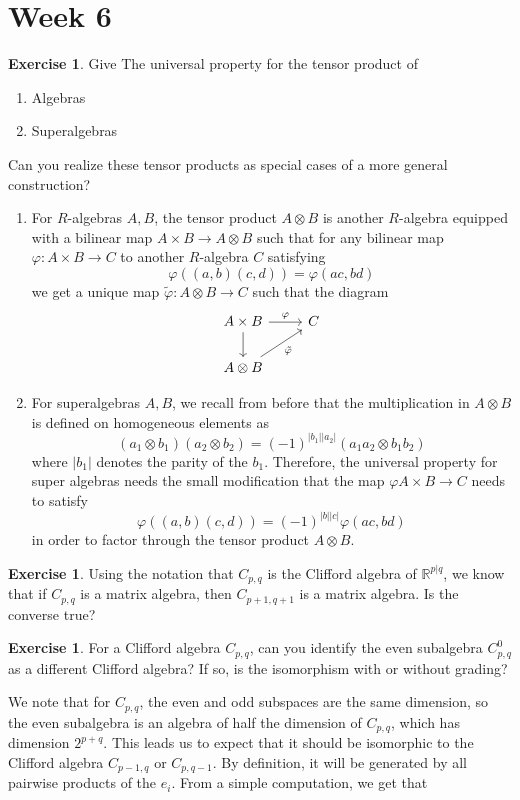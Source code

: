 \documentclass[psamsfonts]{amsart}
\theoremstyle{definition}
\newtheorem{exer}[thm]{Exercise}
\theoremstyle{remark}
\newcommand{\R}{\mathbb{R}}
\begin{document}
\section*{Week 6}
%
\begin{exer}
Give The universal property for the tensor product of
\begin{enumerate}
\item Algebras
\item Superalgebras
\end{enumerate}
Can you realize these tensor products as special cases of a more general construction?
\end{exer}
\begin{enumerate}
\item For $R$-algebras $A,B$, the tensor product $A \otimes B$ is another $R$-algebra equipped with a bilinear map $A \times B \to A \otimes B$ such that for any bilinear map $\varphi : A \times B \to C$ to another $R$-algebra $C$ satisfying 
$$\varphi((a,b)(c,d)) = \varphi(ac, bd)$$
we get a unique map $\tilde{\varphi} : A \otimes B \to C$ such that the diagram
$$\begin{tikzcd}
A \times B \ar[d] \ar[r, "\varphi"] & C \\
A \otimes B \ar[ur, "\tilde{\varphi}"']
\end{tikzcd}$$
\item For superalgebras $A,B$, we recall from before that the multiplication in $A \otimes B$ is defined on homogeneous elements as
$$(a_1 \otimes b_1)(a_2 \otimes b_2) = (-1)^{|b_1||a_2|} (a_1a_2 \otimes b_1b_2)$$
where $|b_1|$ denotes the parity of the $b_1$. Therefore, the universal property for super algebras needs the small modification that the map $\varphi A \times B \to C$ needs to satisfy
$$\varphi((a,b)(c,d)) = (-1)^{|b||c|}\varphi(ac,bd) $$
in order to factor through the tensor product $A \otimes B$.
\end{enumerate}
%
\begin{exer}
Using the notation that $C_{p,q}$ is the Clifford algebra of $\R^{p|q}$, we know that if $C_{p,q}$ is a matrix algebra, then $C_{p+1,q+1}$ is a matrix algebra. Is the converse true?
\end{exer}
%
\begin{exer}
For a Clifford algebra $C_{p,q}$, can you identify the even subalgebra $C_{p,q}^0$ as a different Clifford algebra? If so, is the isomorphism with or without grading?
\end{exer}
We note that for $C_{p,q}$, the even and odd subspaces are the same dimension, so the even subalgebra is an algebra of half the dimension of $C_{p,q}$, which has dimension $2^{p + q}$. This leads us to expect that it should be isomorphic to the Clifford algebra $C_{p-1,q}$ or $C_{p,q-1}$. By definition, it will be generated by all pairwise products of the $e_i$. From a simple computation, we get that
\end{document}
